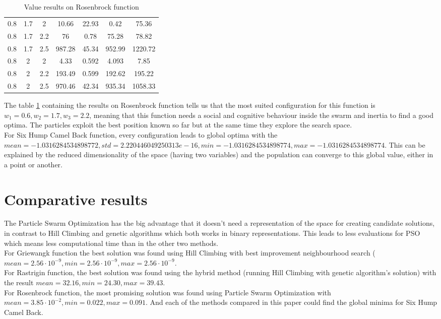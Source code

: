\documentclass{article}
\begin{document}
\begin{table}[h!]
\begin{tabular}{ |c|c|c|c|c|c|c| }
0.8 & 1.7 & 2 & 10.66 & 22.93 & 0.42 & 75.36\\
0.8 & 1.7 & 2.2 & 76 & 0.78 & 75.28 & 78.82\\
0.8 & 1.7 & 2.5 & 987.28 & 45.34 & 952.99 & 1220.72\\
0.8 & 2 & 2 & 4.33 & 0.592 & 4.093 & 7.85\\
0.8 & 2 & 2.2 & 193.49 & 0.599 & 192.62 & 195.22\\
0.8 & 2 & 2.5 & 970.46 & 42.34 & 935.34 & 1058.33\\
\hline
\end{tabular}
\caption{Value results on Rosenbrock function}
\label{table:3}
\end{table}

The table \ref{table:3} containing the results on Rosenbrock function tells us that the most suited configuration for this function is $w_1 = 0.6, w_2 = 1.7, w_3 = 2.2$, meaning that this function needs a social and cognitive behaviour inside the swarm and inertia to find a good optima. The particles exploit the best position known so far but at the same time they explore the search space.\\
For Six Hump Camel Back function, every configuration leads to global optima with the $mean=-1.0316284534898772, std = 2.220446049250313e-16, min = -1.0316284534898774, max = -1.0316284534898774$. This can be explained by the reduced dimensionality of the space (having two variables) and the population can converge to this global value, either in a point or another.

\section{Comparative results}
The Particle Swarm Optimization has the big advantage that it doesn't need a representation of the space for creating candidate solutions, in contrast to Hill Climbing and genetic algorithms which both works in binary representations. This leads to less evaluations for PSO which means less computational time than in the other two methods. \\
For Griewangk function the best solution was found using Hill Climbing with best improvement neighbourhood search ($mean = 2.56 \cdot 10^{-9}, min = 2.56 \cdot 10^{-9}, max = 2.56 \cdot 10^{-9}$.\\
For Rastrigin function, the best solution was found using the hybrid method (running Hill Climbing with genetic algorithm's solution) with the result $mean = 32.16, min = 24.30, max = 39.43$.\\
For Rosenbrock function, the most promising solution was found using Particle Swarm Optimization with $mean = 3.85 \cdot 10^{-2}, min = 0.022, max = 0.091$.
And each of the methods compared in this paper could find the global minima for Six Hump Camel Back.
\end{document}
